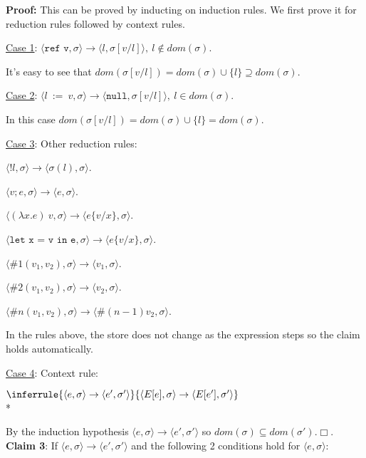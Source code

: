 \documentclass[10pt]{article}
\newcommand{\Rule}[3]{
    \label{rule:#1}
  \hfill
  \ensuremath{\inferrule{#2}{#3}}
  \hfill
}
\begin{document}
\begin{enumerate} [(a)]
    \textbf{Proof:} This can be proved by inducting on induction rules. We first prove it for reduction rules followed by context rules.

    \underline{Case 1}: $\langle \texttt{ref v}, \sigma \rangle \rightarrow \langle l, \sigma[v/l] \rangle,~l \notin dom(\sigma)$.

    It's easy to see that $dom(\sigma[v/l]) = dom(\sigma) \cup \{l\} \supseteq dom(\sigma)$.

    \underline{Case 2}: $\langle l~:=~v, \sigma \rangle \rightarrow \langle \texttt{null}, \sigma[v/l] \rangle,~l \in dom(\sigma)$.

    In this case $dom(\sigma[v/l]) = dom(\sigma) \cup \{l\} = dom(\sigma)$.

    \underline{Case 3}:  Other reduction rules:

    $\langle !l, \sigma \rangle \rightarrow \langle \sigma(l), \sigma\rangle$.
    
    $\langle v;e, \sigma \rangle \rightarrow \langle e, \sigma \rangle$.

    $\langle (\lambda x.e)~v, \sigma \rangle \rightarrow \langle e\{v/x\}, \sigma \rangle$.

    $\langle \texttt{let x = v in e}, \sigma \rangle \rightarrow \langle e\{v/x\}, \sigma \rangle$.

    $\langle \#1(v_1, v_2), \sigma \rangle \rightarrow \langle v_1, \sigma \rangle$.

    $\langle \#2(v_1, v_2), \sigma \rangle \rightarrow \langle v_2, \sigma \rangle$.

    $\langle \#n(v_1, v_2), \sigma \rangle \rightarrow \langle \#(n-1)v_2, \sigma \rangle$.

    In the rules above, the store does not change as the expression steps so the claim holds automatically.

    \underline{Case 4}: Context rule:

    \Rule{}{
    \langle e, \sigma \rangle \rightarrow \langle e', \sigma' \rangle
  }{
    \langle E[e], \sigma \rangle \rightarrow \langle E[e'], \sigma' \rangle
  } \\*

    By the induction hypothesis $\langle e, \sigma \rangle \rightarrow \langle e', \sigma' \rangle$ so $dom(\sigma) \subseteq dom(\sigma')$.$\Box$.\\

    \textbf{Claim 3}: If $\langle e, \sigma \rangle \rightarrow \langle e', \sigma' \rangle$ and the following 2 conditions hold for $\langle e, \sigma \rangle$: 


\end{enumerate}
\end{document}
